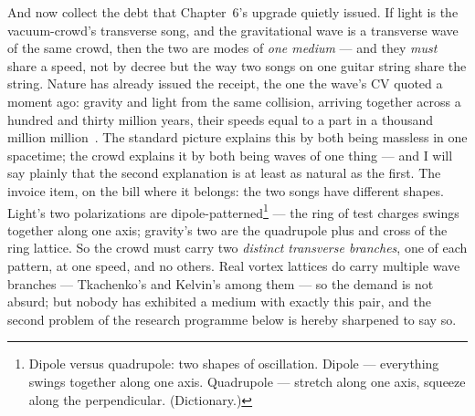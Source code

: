 \documentclass[fontsize=11pt,paper=a4,pagesize=auto,parskip=half-]{scrbook}
\begin{document}
And now collect the debt that Chapter~6's upgrade quietly issued. If light is the vacuum-crowd's transverse song, and the gravitational wave is a transverse wave of the same crowd, then the two are modes of \emph{one medium} --- and they \emph{must} share a speed, not by decree but the way two songs on one guitar string share the string. Nature has already issued the receipt, the one the wave's CV quoted a moment ago: gravity and light from the same collision, arriving together across a hundred and thirty million years, their speeds equal to a part in a thousand million million~\cite{ligo2017}. The standard picture explains this by both being massless in one spacetime; the crowd explains it by both being waves of one thing --- and I will say plainly that the second explanation is at least as natural as the first. The invoice item, on the bill where it belongs: the two songs have different shapes. Light's two polarizations are dipole-patterned\footnote{Dipole versus quadrupole: two shapes of oscillation. Dipole --- everything swings together along one axis. Quadrupole --- stretch along one axis, squeeze along the perpendicular. (Dictionary.)} --- the ring of test charges swings together along one axis; gravity's two are the quadrupole plus and cross of the ring lattice. So the crowd must carry two \emph{distinct transverse branches}, one of each pattern, at one speed, and no others. Real vortex lattices do carry multiple wave branches --- Tkachenko's and Kelvin's among them --- so the demand is not absurd; but nobody has exhibited a medium with exactly this pair, and the second problem of the research programme below is hereby sharpened to say so.
\end{document}
